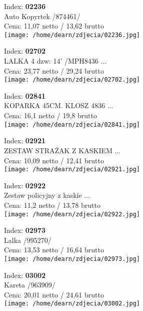 {Index: \textbf{02236}\\
Auto Kopyrtek /874461/\\
Cena: 11,07 netto / 13,62 brutto\\
  \texttt{[image: /home/dearn/zdjecia/02236.jpg]}}\newline\newline

{Index: \textbf{02702}\\
LALKA 4 dzw: 14' /MPH8436 ...\\
Cena: 23,77 netto / 29,24 brutto\\
  \texttt{[image: /home/dearn/zdjecia/02702.jpg]}}\newline\newline

{Index: \textbf{02841}\\
KOPARKA 45CM.  KLOSZ 4836 ...\\
Cena: 16,1 netto / 19,8 brutto\\
  \texttt{[image: /home/dearn/zdjecia/02841.jpg]}}\newline\newline

{Index: \textbf{02921}\\
ZESTAW STRAŻAK Z KASKIEM  ...\\
Cena: 10,09 netto / 12,41 brutto\\
  \texttt{[image: /home/dearn/zdjecia/02921.jpg]}}\newline\newline

{Index: \textbf{02922}\\
Zestaw policyjny z kaskie ...\\
Cena: 11,2 netto / 13,78 brutto\\
  \texttt{[image: /home/dearn/zdjecia/02922.jpg]}}\newline\newline

{Index: \textbf{02973}\\
Lalka /995270/\\
Cena: 13,53 netto / 16,64 brutto\\
  \texttt{[image: /home/dearn/zdjecia/02973.jpg]}}\newline\newline

{Index: \textbf{03002}\\
Kareta /963909/\\
Cena: 20,01 netto / 24,61 brutto\\
  \texttt{[image: /home/dearn/zdjecia/03002.jpg]}}\newline\newline

